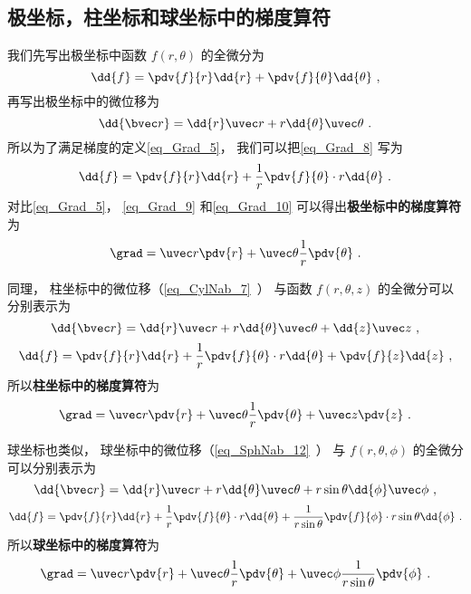 \subsection{极坐标，柱坐标和球坐标中的梯度算符}\label{sub_Grad_1}

我们先写出极坐标中函数 $f(r,\theta)$ 的全微分为
\begin{equation}\label{eq_Grad_8}
\dd{f} = \pdv{f}{r} \dd{r} + \pdv{f}{\theta} \dd{\theta}~,
\end{equation}
再写出极坐标中的微位移为
\begin{equation}\label{eq_Grad_9}
\dd{\bvec r} = \dd{r} \uvec r + r \dd{\theta} \uvec \theta~.
\end{equation}
所以为了满足梯度的定义\autoref{eq_Grad_5}， 我们可以把\autoref{eq_Grad_8} 写为
\begin{equation}\label{eq_Grad_10}
\dd{f} = \pdv{f}{r} \dd{r} + \frac1r \pdv{f}{\theta} \cdot r\dd{\theta}~.
\end{equation}
对比\autoref{eq_Grad_5}， \autoref{eq_Grad_9} 和\autoref{eq_Grad_10} 可以得出\textbf{极坐标中的梯度算符}为
\begin{equation}
\grad = \uvec r \pdv{r} + \uvec \theta \frac1r \pdv{\theta}~.
\end{equation}

同理， 柱坐标中的微位移（\autoref{eq_CylNab_7}~） 与函数 $f(r,\theta, z)$ 的全微分可以分别表示为
\begin{equation}
\dd{\bvec r} = \dd{r} \uvec r + r\dd{\theta} \uvec \theta + \dd{z} \uvec z~,
\end{equation}
\begin{equation}
\dd{f} = \pdv{f}{r} \dd{r} + \frac1r \pdv{f}{\theta} \cdot  r\dd{\theta} + \pdv{f}{z} \dd{z}~,
\end{equation}
所以\textbf{柱坐标中的梯度算符}为
\begin{equation}
\grad = \uvec r \pdv{r} + \uvec \theta \frac1r \pdv{\theta} + \uvec z \pdv{z}~.
\end{equation}

球坐标也类似， 球坐标中的微位移（\autoref{eq_SphNab_12}~） 与 $f(r,\theta,\phi)$ 的全微分可以分别表示为
\begin{equation}
\dd{\bvec r} = \dd{r}\uvec r + r\dd{\theta} \uvec \theta + r\sin\theta\dd{\phi}\uvec \phi~,
\end{equation}
\begin{equation}
\dd{f} = \pdv{f}{r} \dd{r} + \frac1r \pdv{f}{\theta} \cdot r\dd{\theta} + \frac{1}{ r\sin\theta} \pdv{f}{\phi} \cdot r\sin\theta\dd{\phi}~.
\end{equation}
所以\textbf{球坐标中的梯度算符}为
\begin{equation}
\grad = \uvec r \pdv{r} + \uvec \theta \frac1r \pdv{\theta} + \uvec \phi \frac{1}{ r\sin\theta} \pdv{\phi}~.
\end{equation}


